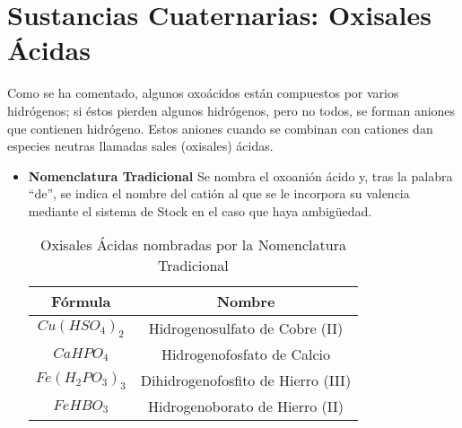 \documentclass[11pt,fleqn]{book} %
\begin{document}
\section{Sustancias Cuaternarias: Oxisales Ácidas}
Como se ha comentado, algunos oxoácidos están compuestos por varios hidrógenos; si éstos pierden algunos hidrógenos, pero no todos, se forman aniones que contienen hidrógeno. Estos aniones cuando se combinan con cationes dan especies neutras llamadas sales (oxisales) ácidas.\\
\begin{itemize}
	\item \textbf{Nomenclatura Tradicional} Se nombra el oxoanión ácido y, tras la palabra “de”, se indica el nombre del catión al que se le incorpora su valencia mediante el sistema de Stock en el caso que haya ambigüedad.
	\begin{table}[h!]
		\centering
		\begin{tabular}{c|c}
			Fórmula&Nombre\\ \hline
			$Cu(HSO_4)_2$&Hidrogenosulfato de Cobre (II)\\
			$CaHPO_4$&Hidrogenofosfato de Calcio\\
			$Fe(H_2PO_3)_3$&Dihidrogenofosfito de Hierro (III)\\
			$FeHBO_3$&Hidrogenoborato de Hierro (II)\\ \hline
		\end{tabular}
		\caption{Oxisales Ácidas nombradas por la Nomenclatura Tradicional}
	\end{table}


\end{itemize}
\end{document}
